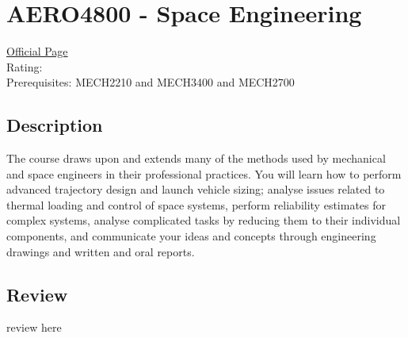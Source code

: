 \hypertarget{AERO4800}{\section{AERO4800 - Space Engineering}}

\large
\textcolor{turbo_purple}{\href{https://my.uq.edu.au/programs-courses/course.html?course_code=AERO4800}{Official Page}} \\
Rating: \cstar\cstar\cstar\cstar\ostar \\
Prerequisites: MECH2210 and MECH3400 and MECH2700

\normalsize
\subsection*{Description}
The course draws upon and extends many of the methods used by mechanical and space engineers in their professional practices.
You will learn how to perform advanced trajectory design and launch vehicle sizing; analyse issues related to thermal loading and control of space systems, perform reliability estimates for complex systems, analyse complicated tasks by reducing them to their individual components, and communicate your ideas and concepts through engineering drawings and written and oral reports.

\subsection*{Review}
review here
